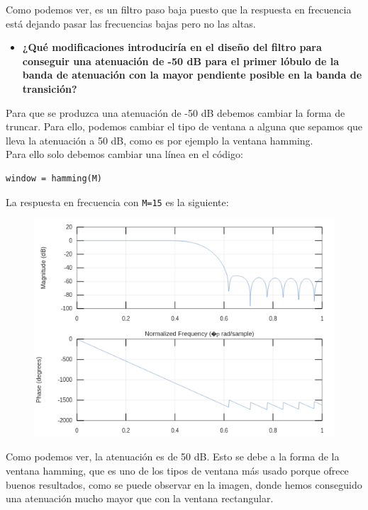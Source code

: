 \documentclass[11pt,a4paper]{article}
\begin{document}
Como podemos ver, es un filtro paso baja puesto que la respuesta en frecuencia está dejando pasar las frecuencias bajas pero no las altas.

\begin{itemize}
	\item \textbf{¿Qué modificaciones introduciría en el diseño del filtro para conseguir una atenuación de -50 dB para el primer lóbulo de la banda de atenuación con la mayor pendiente posible en la banda de transición?}
\end{itemize}

Para que se produzca una atenuación de -50 dB debemos cambiar la forma de truncar. Para ello, podemos cambiar el tipo de ventana a alguna que sepamos que lleva la atenuación a 50 dB, como es por ejemplo la ventana hamming.\\

Para ello solo debemos cambiar una línea en el código:

\begin{lstlisting}[frame=single]
% Cambiamos la ventana de truncado
window = hamming(M)
\end{lstlisting}

La respuesta en frecuencia con \texttt{M=15} es la siguiente:

\begin{figure}[H]
	\centering
	\includegraphics[scale=0.5]{img/2.png}
\end{figure}

Como podemos ver, la atenuación es de 50 dB. Esto se debe a la forma de la ventana hamming, que es uno de los tipos de ventana más usado porque ofrece buenos resultados, como se puede observar en la imagen, donde hemos conseguido una atenuación mucho mayor que con la ventana rectangular.
\end{document}
